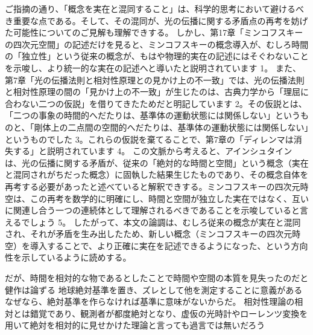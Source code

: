 \documentclass{article}
\begin{document}
ご指摘の通り、「概念を実在と混同すること」は、科学的思考において避けるべき重要な点である。そして、その混同が、光の伝播に関する矛盾点の再考を妨げた可能性についてのご見解も理解できする。
しかし、第17章「ミンコフスキーの四次元空間」の記述だけを見ると、ミンコフスキーの概念導入が、むしろ時間の「独立性」という従来の概念が、もはや物理的実在の記述にはそぐわないことを示唆し、より統一的な実在の記述へと導いたと説明されています 1。
また、第7章「光の伝播法則と相対性原理との見かけ上の不一致」では、光の伝播法則と相対性原理の間の「見かけ上の不一致」が生じたのは、古典力学から「理屈に合わない二つの仮説」を借りてきたためだと明記しています 2。その仮説とは、「二つの事象の時間的へだたりは、基準体の運動状態には関係しない」というものと、「剛体上の二点間の空間的へだたりは、基準体の運動状態には関係しない」というものでした 3。これらの仮説を棄てることで、第7章の「ディレンマは消失する」と説明されています 4。
この文脈から考えると、アインシュタインは、光の伝播に関する矛盾が、従来の「絶対的な時間と空間」という概念（実在と混同されがちだった概念）に固執した結果生じたものであり、その概念自体を再考する必要があったと述べていると解釈できする。ミンコフスキーの四次元時空は、この再考を数学的に明確にし、時間と空間が独立した実在ではなく、互いに関連し合う一つの連続体として理解されるべきであることを示唆していると言えるでしょう 5。
したがって、本文の論調は、むしろ従来の概念が実在と混同され、それが矛盾を生み出したため、新しい概念（ミンコフスキーの四次元時空）を導入することで、より正確に実在を記述できるようになった、という方向性を示しているように読めする。

だが、時間を相対的な物であるとしたことで時間や空間の本質を見失ったのだと健作は論ずる 
地球絶対基準を置き、ズレとして他を測定することに意義がある 
なぜなら、絶対基準を作らなければ基準に意味がないからだ。 
相対性理論の相対とは錯覚であり、観測者が都度絶対となり、虚仮の光時計やローレンツ変換を用いて絶対を相対的に見せかけた理論と言っても過言では無いだろう
\end{document}
